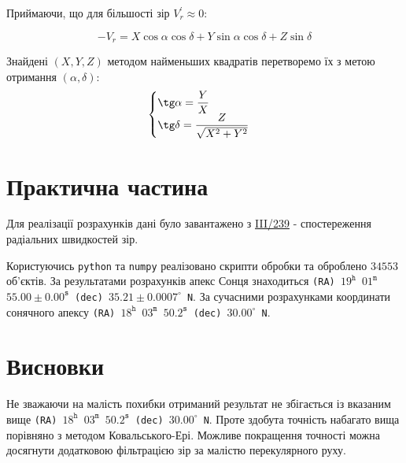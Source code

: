 \documentclass[12pt]{article}
\begin{document}
  Приймаючи, що для більшості зір $V_r^{'}\approx0$:

  \begin{equation}
    -V_r = X\cos\alpha\cos\delta + Y\sin\alpha\cos\delta + Z\sin\delta
  \end{equation}

  Знайдені $(X, Y, Z)$ методом найменьших квадратів перетворемо їх з метою отримання $(\alpha, \delta)$:
  \begin{equation}
    \begin{cases}
      \tg\alpha = \dfrac{Y}{X}\\
      \tg\delta = \dfrac{Z}{\sqrt{X^2+Y^2}}\\
    \end{cases}
  \end{equation}

\section*{Практична частина}

  Для реалізації розрахунків дані було завантажено з \href{http://cdsarc.u-strasbg.fr/viz-bin/Cat?target=http&cat=III\%2F239&}{III/239} - спостереження радіальних швидкостей зір.

  Користуючись \texttt{python} та \texttt{numpy} реалізовано скрипти обробки та оброблено $34553$ об'єктів. За результатами розрахунків апекс Сонця знаходиться \texttt{(RA) $19^{\texttt{h}}$ $01^{\texttt{m}}$ $55.00 \pm 0.00^{\texttt{s}}$ (dec) $35.21 \pm 0.0007^{\circ}$ N}. За сучасними розрахунками координати сонячного апексу \texttt{(RA) $18^{\texttt{h}}$ $03^{\texttt{m}}$ $50.2^{\texttt{s}}$ (dec) $30.00^{\circ}$ N}.

\section*{Висновки}

  Не зважаючи на малість похибки отриманий результат не збігається із вказаним вище \texttt{(RA) $18^{\texttt{h}}$ $03^{\texttt{m}}$ $50.2^{\texttt{s}}$ (dec) $30.00^{\circ}$ N}. Проте здобута точність набагато вища порівняно з методом Ковальського-Ері. Можливе покращення точності можна досягнути додатковою фільтрацією зір за малістю перекулярного руху.
\end{document}
